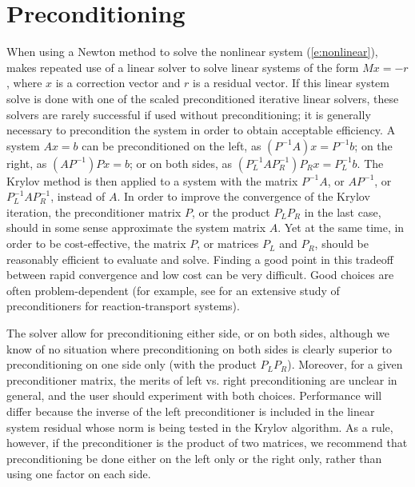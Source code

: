 \section{Preconditioning}\label{s:preconditioning}

When using a Newton method to solve the nonlinear system (\ref{e:nonlinear}),
{\cvodes} makes repeated use of a linear solver to solve linear systems of the form
$M x = - r$, where $x$ is a correction vector and $r$ is a residual vector.
If this linear system solve is done with one of the scaled preconditioned iterative 
linear solvers, these solvers are rarely successful if used without preconditioning;
it is generally necessary to precondition the system in order to obtain acceptable efficiency.  
A system $A x = b$ can be preconditioned on the left, as $(P^{-1}A) x = P^{-1} b$;
on the right, as $(A P^{-1}) P x = b$; or on both sides, as
$(P_L^{-1} A P_R^{-1}) P_R x = P_L^{-1}b$.  The Krylov method is then
applied to a system with the matrix $P^{-1}A$, or $AP^{-1}$, or
$P_L^{-1} A P_R^{-1}$, instead of $A$.  In order to improve the
convergence of the Krylov iteration, the preconditioner matrix $P$, or
the product $P_L P_R$ in the last case, should in some sense
approximate the system matrix $A$.  Yet at the same time, in order to
be cost-effective, the matrix $P$, or matrices $P_L$ and $P_R$, should
be reasonably efficient to evaluate and solve.  Finding a good point
in this tradeoff between rapid convergence and low cost can be very
difficult.  Good choices are often problem-dependent (for example, see
\cite{BrHi:89} for an extensive study of preconditioners for
reaction-transport systems).

The {\cvodes} solver allow for preconditioning either
side, or on both sides, although we know of no situation where
preconditioning on both sides is clearly superior to
preconditioning on one side only (with the product $P_L P_R$).
Moreover, for a given preconditioner matrix, the merits of left vs. right
preconditioning are unclear in general, and the user should experiment
with both choices.  Performance will differ because the inverse of the
left preconditioner is included in the linear system residual whose
norm is being tested in the Krylov algorithm.  As a rule, however, if
the preconditioner is the product of two matrices, we recommend that
preconditioning be done either on the left only or the right only,
rather than using one factor on each side. 

